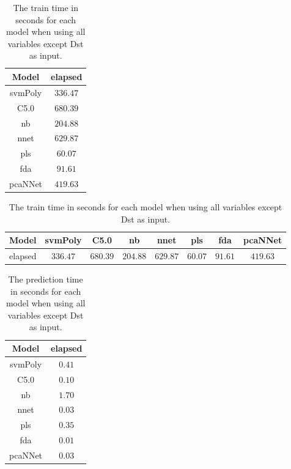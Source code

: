\begin{table}[!ht]
	\centering
	\begin{tabular}{|c|c|}
		\hline
		Model & elapsed \\ \hline
		svmPoly & $336.47$ \\ \hline
		C5.0 & $680.39$ \\ \hline
		nb & $204.88$ \\ \hline
		nnet & $629.87$ \\ \hline
		pls & $60.07$ \\ \hline
		fda & $91.61$ \\ \hline
		pcaNNet & $419.63$ \\ \hline
	\end{tabular}
	\caption{The train time in seconds for each model when using all variables except Dst as input.}
	\label{tab:time:noDst:train}
\end{table}

\begin{table}[!ht]
	\centering
	\begin{tabular}{|c|c|c|c|c|c|c|c|}
		\hline
		Model & svmPoly & C5.0 & nb & nnet & pls & fda & pcaNNet \\ \hline
		elapsed & $336.47$ & $680.39$ & $204.88$ & $629.87$ & $60.07$ & $91.61$ & $419.63$ \\ \hline
	\end{tabular}
	\caption{The train time in seconds for each model when using all variables except Dst as input.}
	\label{tab:time:reverse:noDst:train}
\end{table}

\begin{table}[!ht]
	\centering
	\begin{tabular}{|c|c|}
		\hline
		Model & elapsed \\ \hline
		svmPoly & $0.41$ \\ \hline
		C5.0 & $0.10$ \\ \hline
		nb & $1.70$ \\ \hline
		nnet & $0.03$ \\ \hline
		pls & $0.35$ \\ \hline
		fda & $0.01$ \\ \hline
		pcaNNet & $0.03$ \\ \hline
	\end{tabular}
	\caption{The prediction time in seconds for each model when using all variables except Dst as input.}
	\label{tab:time:noDst:predict}
\end{table}

